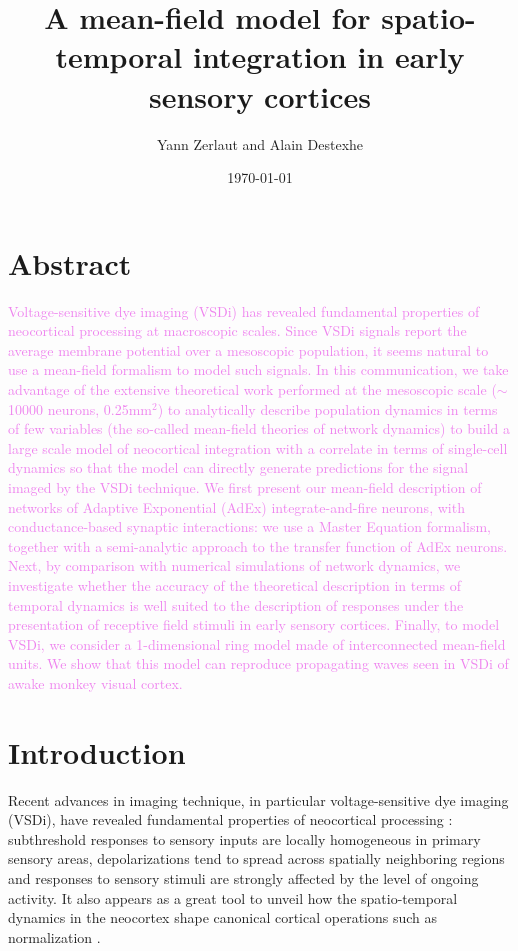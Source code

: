 \documentclass[8pt, colorlinks, a4paper]{article}
\author{Yann Zerlaut and Alain Destexhe}
\date{\today}
\title{A mean-field model for spatio-temporal integration in
  early sensory cortices}
\newcommand{\corr}[1]{{\textcolor{violet}{#1}}}
\begin{document}
\maketitle

\linenumbers

\section{Abstract}
\label{sec-1}
\bfseries

\corr{Voltage-sensitive dye imaging (VSDi) has revealed fundamental
  properties of neocortical processing at macroscopic scales.  Since
  VSDi signals report the average membrane potential over a mesoscopic
  population, it seems natural to use a mean-field formalism to model
  such signals. In this communication, we take advantage of the
  extensive theoretical work performed at the mesoscopic scale
  ($\sim$10000 neurons, 0.25mm$^2$) to analytically describe
  population dynamics in terms of few variables (the so-called
  mean-field theories of network dynamics) to build a large scale
  model of neocortical integration with a correlate in terms of
  single-cell dynamics so that the model can directly generate
  predictions for the signal imaged by the VSDi technique. We first
  present our mean-field description of networks of Adaptive
  Exponential (AdEx) integrate-and-fire neurons, with
  conductance-based synaptic interactions: we use a Master Equation
  formalism, together with a semi-analytic approach to the transfer
  function of AdEx neurons. Next, by comparison with numerical
  simulations of network dynamics, we investigate whether the accuracy
  of the theoretical description in terms of temporal dynamics is well
  suited to the description of responses under the presentation of
  receptive field stimuli in early sensory cortices. Finally, to model
  VSDi, we consider a 1-dimensional ring model made of interconnected
  mean-field units.  We show that this model can reproduce propagating
  waves seen in VSDi of awake monkey visual cortex.}

\normalfont

\section{Introduction}
\label{sec-2}
\normalfont

Recent advances in imaging technique, in particular voltage-sensitive
dye imaging (VSDi), have revealed fundamental properties of
neocortical processing
\cite{Arieli1996,Contreras2001,Petersen2001,Ferezou2006,Civillico2012}:
subthreshold responses to sensory inputs are locally homogeneous in
primary sensory areas, depolarizations tend to spread across spatially
neighboring regions and responses to sensory stimuli are strongly
affected by the level of ongoing activity. It also appears as a great
tool to unveil how the spatio-temporal dynamics in the neocortex shape
canonical cortical operations such as normalization
\cite{Reynaud2012}.
\end{document}
